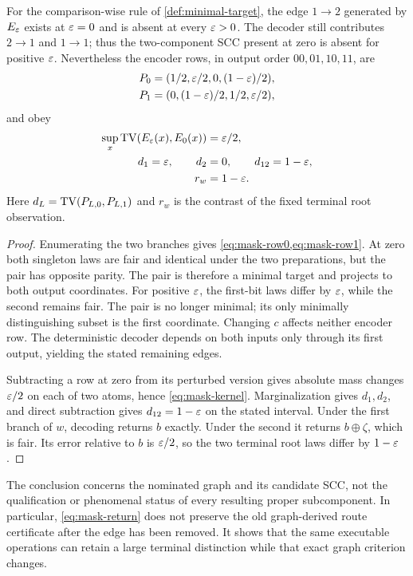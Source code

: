 \begin{theorem}\label{p2-02}
For the comparison-wise rule of \cref{def:minimal-target}, the edge \(1\to2\) generated by \(E_\varepsilon\) exists at \(\varepsilon=0\) and is absent at every \(\varepsilon>0\). The decoder still contributes \(2\to1\) and \(1\to1\); thus the two-component SCC present at zero is absent for positive \(\varepsilon\). Nevertheless the encoder rows, in output order \(00,01,10,11\), are
\begin{align}
 P_0&=(1/2,\varepsilon/2,0,(1-\varepsilon)/2),\label{eq:mask-row0}\\
 P_1&=(0,(1-\varepsilon)/2,1/2,\varepsilon/2),\label{eq:mask-row1}
\end{align}
and obey
\begin{align}
 \sup_x\operatorname{TV}(E_\varepsilon(x),E_0(x))&=\varepsilon/2,\label{eq:mask-kernel}\\
 d_1=\varepsilon,\qquad d_2&=0,\qquad d_{12}=1-\varepsilon,\label{eq:mask-contrasts}\\
 r_w&=1-\varepsilon.\label{eq:mask-return}
\end{align}
Here \(d_L=\operatorname{TV}(P_{L,0},P_{L,1})\) and \(r_w\) is the contrast of the fixed terminal root observation.
\end{theorem}
\begin{proof}
Enumerating the two branches gives \cref{eq:mask-row0,eq:mask-row1}. At zero both singleton laws are fair and identical under the two preparations, but the pair has opposite parity. The pair is therefore a minimal target and projects to both output coordinates. For positive \(\varepsilon\), the first-bit laws differ by \(\varepsilon\), while the second remains fair. The pair is no longer minimal; its only minimally distinguishing subset is the first coordinate. Changing \(c\) affects neither encoder row. The deterministic decoder depends on both inputs only through its first output, yielding the stated remaining edges.

Subtracting a row at zero from its perturbed version gives absolute mass changes \(\varepsilon/2\) on each of two atoms, hence \cref{eq:mask-kernel}. Marginalization gives \(d_1,d_2\), and direct subtraction gives \(d_{12}=1-\varepsilon\) on the stated interval. Under the first branch of \(w\), decoding returns \(b\) exactly. Under the second it returns \(b\oplus\zeta\), which is fair. Its error relative to \(b\) is \(\varepsilon/2\), so the two terminal root laws differ by \(1-\varepsilon\).
\end{proof}

The conclusion concerns the nominated graph and its candidate SCC, not the qualification or phenomenal status of every resulting proper subcomponent. In particular, \cref{eq:mask-return} does not preserve the old graph-derived route certificate after the edge has been removed. It shows that the same executable operations can retain a large terminal distinction while that exact graph criterion changes.

